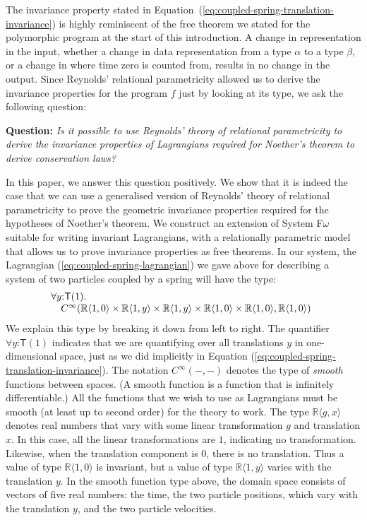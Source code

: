 \documentclass{sigplanconf}
\theoremstyle{examplestyle}
\begin{document}
The invariance property stated in
Equation~(\ref{eq:coupled-spring-translation-invariance}) is highly
reminiscent of the free theorem we stated for the polymorphic program
at the start of this introduction. A change in representation in the
input, whether a change in data representation from a type $\alpha$ to
a type $\beta$, or a change in where time zero is counted from,
results in no change in the output. Since Reynolds' relational
parametricity allowed us to derive the invariance properties for the
program $f$ just by looking at its type, we ask the following
question:

\medskip

\noindent
\textbf{Question:} \emph{Is it possible to use Reynolds' theory of
  relational parametricity to derive the invariance properties of
  Lagrangians required for Noether's theorem to derive conservation
  laws?}

\medskip

In this paper, we answer this question positively. We show that it is
indeed the case that we can use a generalised version of Reynolds'
theory of relational parametricity to prove the geometric invariance
properties required for the hypotheses of Noether's theorem. We
construct an extension of System F$\omega$ suitable for writing
invariant Lagrangians, with a relationally parametric model that
allows us to prove invariance properties as free theorems. In our
system, the Lagrangian (\ref{eq:coupled-spring-lagrangian}) we gave
above for describing a system of two particles coupled by a spring
will have the type:
\begin{displaymath}
  \begin{array}{@{}l}
  \forall y \mathord: \mathsf{T}(1).\\
  \quad C^\infty(\mathbb{R}\langle 1, 0 \rangle \times \mathbb{R}\langle 1, y \rangle \times \mathbb{R}\langle 1, y \rangle \times \mathbb{R}\langle 1, 0 \rangle \times \mathbb{R}\langle 1, 0 \rangle, \mathbb{R}\langle 1, 0 \rangle)
\end{array}
\end{displaymath}
We explain this type by breaking it down from left to right. The
quantifier $\forall y \mathord: \mathsf{T}(1)$ indicates that we are
quantifying over all translations $y$ in one-dimensional space, just
as we did implicitly in Equation
(\ref{eq:coupled-spring-translation-invariance}). The notation
$C^\infty(-,-)$ denotes the type of \emph{smooth} functions between
spaces. (A smooth function is a function that is infinitely
differentiable.) All the functions that we wish to use as Lagrangians
must be smooth (at least up to second order) for the theory to
work. The type $\mathbb{R}\langle g, x \rangle$ denotes real numbers
that vary with some linear transformation $g$ and translation $x$. In
this case, all the linear transformations are $1$, indicating no
transformation. Likewise, when the translation component is $0$, there
is no translation. Thus a value of type $\mathbb{R}\langle 1, 0
\rangle$ is invariant, but a value of type $\mathbb{R}\langle 1, y
\rangle$ varies with the translation $y$. In the smooth function type
above, the domain space consists of vectors of five real numbers: the
time, the two particle positions, which vary with the translation $y$,
and the two particle velocities.
\end{document}
